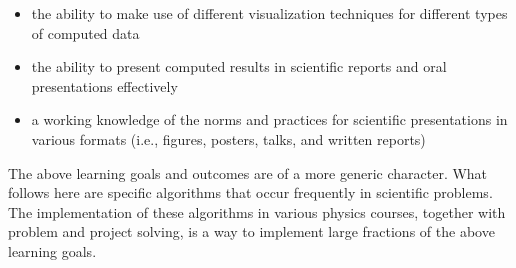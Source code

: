 \documentclass[graybox,envcountchap,sectrefs]{svmult}
\begin{document}
\begin{itemize}
\item the ability to make use of different visualization techniques for different types of computed data

\item the ability to present computed results in scientific reports and oral presentations effectively

\item a working knowledge of the norms and practices for scientific presentations in various formats (i.e., figures, posters, talks, and written reports)
\end{itemize}


The above learning goals and outcomes are of a more generic character. What follows here are specific
algorithms that occur frequently in scientific problems. The implementation of these algorithms in various physics courses, together with problem and project solving, is a way to implement large fractions of the above learning goals.
\end{document}
